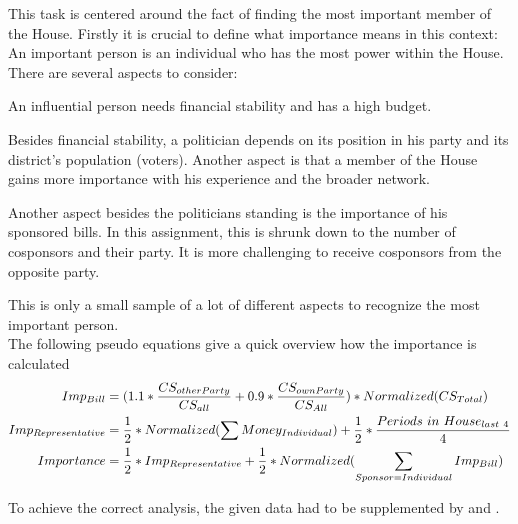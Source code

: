 \begin{homeworkProblem}
  This task is centered around the fact of finding the most important member of the House. Firstly it is crucial to define what importance means in this context:\\

  An important person is an individual who has the most power within the House. There are several aspects to consider:
  \begin{description}[labelindent=1cm]
    \item[Money] An influential person needs financial stability and has a high budget.
    \item[Reelections] Besides financial stability, a politician depends on its position in his party and its district's population (voters). Another aspect is that a member of the House gains more importance with his experience and the broader network.
    \item[Bills] Another aspect besides the politicians standing is the importance of his sponsored bills. In this assignment, this is shrunk down to the number of cosponsors and their party. It is more challenging to receive cosponsors from the opposite party.
  \end{description}
  This is only a small sample of a lot of different aspects to recognize the most important person.\\

  The following pseudo equations give a quick overview how the importance is calculated
      \begin{align}
      Imp_{Bill} & = (1.1 * \frac{CS_{other Party}}{CS_{all}} + 0.9 * \frac{CS_{own Party}}{CS_{All}}) * Normalized(CS_{Total})  \\
      Imp_{Representative} & = \frac{1}{2} * Normalized(\sum Money_{Individual}) + \frac{1}{2} * \frac{Periods~in~House_{last~4}}{4}\\
      Importance & = \frac{1}{2} * Imp_{Representative} + \frac{1}{2} * Normalized(\sum_{Sponsor = \newline Individual} Imp_{Bill})\\
    \end{align}

To achieve the correct analysis, the given data had to be supplemented by \cite{ProPublica:bills} and \cite{ProPublica:expenses}.\\


\end{homeworkProblem}
